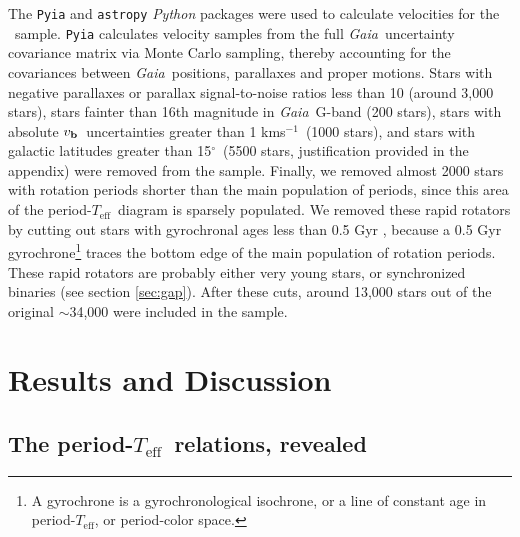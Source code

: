 \documentclass{aastex63}
\newcommand{\gaia}{{\it Gaia}}
\newcommand{\teff}{$T_{\mathrm{eff}}$}
\newcommand{\degrees}{$^\circ$}
\newcommand{\vb}{$v_{\bf b}$}
\newcommand{\kms}{kms$^{-1}$}
\newcommand{\mct}{\citet{mcquillan2014}}
\newcommand{\racomment}[1]{{\color{black}#1}}
\begin{document}
The {\tt Pyia} \citep{price-whelan2018} and {\tt astropy} \citep{astropy2013,
astropy2018} {\it Python} packages were used to calculate velocities for the
\mct\ sample.
{\tt Pyia} calculates velocity samples from the full \gaia\ uncertainty
covariance matrix via Monte Carlo sampling, thereby accounting for the
covariances between \gaia\ positions, parallaxes and proper motions.
Stars with negative parallaxes or parallax signal-to-noise ratios less than 10
(around 3,000 stars), stars fainter than 16th magnitude \racomment{in \gaia\
G-band} (200 stars), stars with absolute \vb\ uncertainties greater than 1
\kms\ (1000 stars), and stars with galactic latitudes greater than 15\degrees\
(5500 stars, justification provided in the appendix) were removed from the
sample.
Finally, we removed almost 2000 stars with rotation periods shorter than the
main population of periods, since this area of the period-\teff\ diagram is
sparsely populated.
We removed these rapid rotators by cutting out stars with gyrochronal ages
less than 0.5 Gyr \citep[based on the][gyro-model]{angus2019}, because a 0.5
Gyr gyrochrone\footnote{A gyrochrone is a gyrochronological isochrone, or a
line of constant age in period-\teff, or period-color space.} traces the
bottom edge of the main population of rotation periods.
\racomment{These rapid rotators are probably either very young stars, or
synchronized binaries (see section \ref{sec:gap}).}
After these cuts, around
13,000 stars out of the original $\sim$34,000 were included in the sample.

\section{Results and Discussion}
\label{sec:results}

\subsection{The period-\teff\ relations, revealed}
\label{sec:the_reveal}
\end{document}
